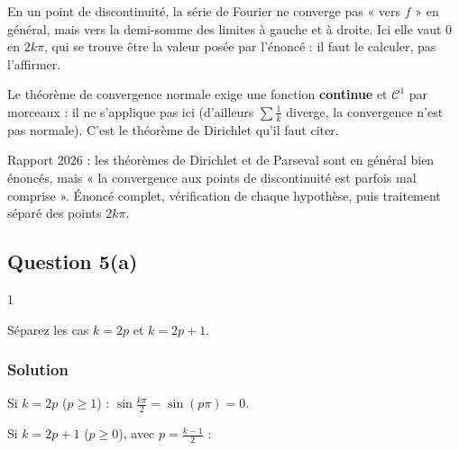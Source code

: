 \documentclass[11pt,a4paper]{article}
\newcommand{\equationajustee}[1]{%
  \sbox{\boiteequation}{$\displaystyle #1$}%
  \ifdim\wd\boiteequation>\linewidth
    \[\resizebox{\linewidth}{!}{\usebox{\boiteequation}}\]%
  \else
    \[#1\]%
  \fi}
\begin{document}
\begin{piege}

En un point de discontinuité, la série de Fourier ne converge pas « vers \(f\) » en général, mais vers la demi-somme des limites à gauche et à droite. Ici elle vaut \(0\) en \(2k\pi\), qui se trouve être la valeur posée par l'énoncé : il faut le calculer, pas l'affirmer.

\end{piege}

\begin{piege}

Le théorème de convergence normale exige une fonction \textbf{continue} et \({\mathcal{C}}^1\) par morceaux : il ne s'applique pas ici (d'ailleurs \(\sum\frac1k\) diverge, la convergence n'est pas normale). C'est le théorème de Dirichlet qu'il faut citer.

\end{piege}

\begin{jury}

Rapport 2026 : les théorèmes de Dirichlet et de Parseval sont en général bien énoncés, mais « la convergence aux points de discontinuité est parfois mal comprise ». Énoncé complet, vérification de chaque hypothèse, puis traitement séparé des points \(2k\pi\).

\end{jury}

\hypertarget{question-5a}{%
\subsection{Question 5(a)}\label{question-5a}}

\begin{indication}{1}

Séparez les cas \(k=2p\) et \(k=2p+1\).

\end{indication}

\hypertarget{solution-5}{%
\subsubsection{Solution}\label{solution-5}}

Si \(k=2p\) (\(p\ge1\)) : \(\sin\frac{k\pi}2=\sin(p\pi)=0\).

Si \(k=2p+1\) (\(p\ge0\)), avec \(p=\frac{k-1}2\) :

\equationajustee{\begin{aligned}
\sin\Big(p\pi+\frac\pi2\Big)&=\cos(p\pi)\\
&=(-1)^p.
\end{aligned}}
\end{document}
